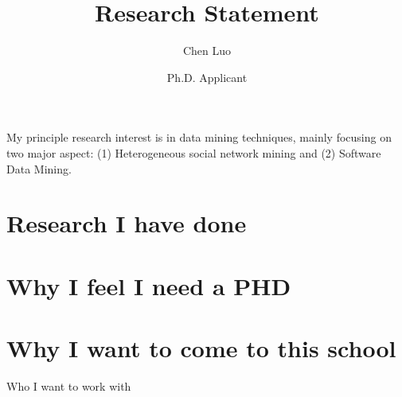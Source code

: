 \documentclass{article}
\title{Research Statement}
\author{Chen Luo}
\date{Ph.D. Applicant}
\begin{document}
\maketitle%

My principle research interest is in data mining techniques, mainly focusing on two major aspect: (1) Heterogeneous social network mining and (2) Software Data Mining.

\section{Research I have done}
%
\section{Why I feel I need a PHD}

\section{Why I want to come to this school}
Who I want to work with
\end{document}
